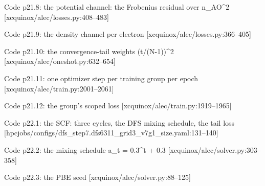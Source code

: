 \begin{frame}[allowframebreaks]{Code p21.8: the potential channel: the Frobenius residual over n\_AO\^{}2 [xcquinox/alec/losses.py:408--483]}
\label{code:p21_8_the_potential_channel_the_frobenius_resi}
\end{frame}
\begin{frame}[allowframebreaks]{Code p21.9: the density channel per electron [xcquinox/alec/losses.py:366--405]}
\label{code:p21_9_the_density_channel_per_electron}
\end{frame}
\begin{frame}[allowframebreaks]{Code p21.10: the convergence-tail weights (t/(N-1))\^{}2 [xcquinox/alec/oneshot.py:632--654]}
\label{code:p21_10_the_convergence_tail_weights_t_n_1_2}
\end{frame}
\begin{frame}[allowframebreaks]{Code p21.11: one optimizer step per training group per epoch [xcquinox/alec/train.py:2001--2061]}
\label{code:p21_11_one_optimizer_step_per_training_group_pe}
\end{frame}
\begin{frame}[allowframebreaks]{Code p21.12: the group's scoped loss [xcquinox/alec/train.py:1919--1965]}
\label{code:p21_12_the_group_s_scoped_loss}
\end{frame}
\begin{frame}[allowframebreaks]{Code p22.1: the SCF: three cycles, the DFS mixing schedule, the tail loss [hpcjobs/configs/dfs\_step7.dfs6311\_grid3\_v7g1\_size.yaml:131--140]}
\label{code:p22_1_the_scf_three_cycles_the_dfs_mixing_sche}
\end{frame}
\begin{frame}[allowframebreaks]{Code p22.2: the mixing schedule a\_t = 0.3\^{}t + 0.3 [xcquinox/alec/solver.py:303--358]}
\label{code:p22_2_the_mixing_schedule_a_t_0_3_t_0_3}
\end{frame}
\begin{frame}[allowframebreaks]{Code p22.3: the PBE seed [xcquinox/alec/solver.py:88--125]}
\label{code:p22_3_the_pbe_seed}
\end{frame}
